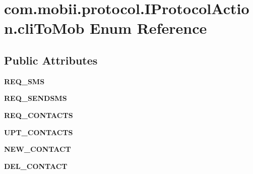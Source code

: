\hypertarget{enumcom_1_1mobii_1_1protocol_1_1_i_protocol_action_1_1cli_to_mob}{\section{com.\-mobii.\-protocol.\-I\-Protocol\-Action.\-cli\-To\-Mob Enum Reference}
\label{enumcom_1_1mobii_1_1protocol_1_1_i_protocol_action_1_1cli_to_mob}
}
\subsection*{Public Attributes}
\begin{DoxyCompactItemize}
\item 
\hypertarget{enumcom_1_1mobii_1_1protocol_1_1_i_protocol_action_1_1cli_to_mob_abb6c75a50d7d980eee5818ebe7123cf7}{{\bfseries R\-E\-Q\-\_\-\-S\-M\-S}}\label{enumcom_1_1mobii_1_1protocol_1_1_i_protocol_action_1_1cli_to_mob_abb6c75a50d7d980eee5818ebe7123cf7}

\item 
\hypertarget{enumcom_1_1mobii_1_1protocol_1_1_i_protocol_action_1_1cli_to_mob_aa0ebd024e02d9860345757afbd49dd14}{{\bfseries R\-E\-Q\-\_\-\-S\-E\-N\-D\-S\-M\-S}}\label{enumcom_1_1mobii_1_1protocol_1_1_i_protocol_action_1_1cli_to_mob_aa0ebd024e02d9860345757afbd49dd14}

\item 
\hypertarget{enumcom_1_1mobii_1_1protocol_1_1_i_protocol_action_1_1cli_to_mob_a4d2dc99cddd0b0fa68ea8c80d59a78dd}{{\bfseries R\-E\-Q\-\_\-\-C\-O\-N\-T\-A\-C\-T\-S}}\label{enumcom_1_1mobii_1_1protocol_1_1_i_protocol_action_1_1cli_to_mob_a4d2dc99cddd0b0fa68ea8c80d59a78dd}

\item 
\hypertarget{enumcom_1_1mobii_1_1protocol_1_1_i_protocol_action_1_1cli_to_mob_ae8b8a956d87d1dadb5b03ac5389fa405}{{\bfseries U\-P\-T\-\_\-\-C\-O\-N\-T\-A\-C\-T\-S}}\label{enumcom_1_1mobii_1_1protocol_1_1_i_protocol_action_1_1cli_to_mob_ae8b8a956d87d1dadb5b03ac5389fa405}

\item 
\hypertarget{enumcom_1_1mobii_1_1protocol_1_1_i_protocol_action_1_1cli_to_mob_a78f4c537c04dae1836806cb211cb8f13}{{\bfseries N\-E\-W\-\_\-\-C\-O\-N\-T\-A\-C\-T}}\label{enumcom_1_1mobii_1_1protocol_1_1_i_protocol_action_1_1cli_to_mob_a78f4c537c04dae1836806cb211cb8f13}

\item 
\hypertarget{enumcom_1_1mobii_1_1protocol_1_1_i_protocol_action_1_1cli_to_mob_aff9d4d566eed39c836661c34fd61d331}{{\bfseries D\-E\-L\-\_\-\-C\-O\-N\-T\-A\-C\-T}}\label{enumcom_1_1mobii_1_1protocol_1_1_i_protocol_action_1_1cli_to_mob_aff9d4d566eed39c836661c34fd61d331}


\end{DoxyCompactItemize}
